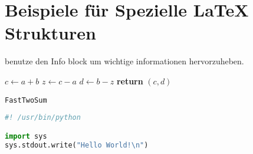 \documentclass[12pt]{article}
\begin{document}
\section{Beispiele für Spezielle LaTeX Strukturen}

\begin{info} %
	benutze den Info block um wichtige informationen hervorzuheben.
\end{info}


\begin{center}
	\begin{minipage}{0.5\linewidth} %
		\begin{algorithm}[H]
			\medskip
			$c \leftarrow a + b$ \;
			$z \leftarrow c - a$ \;
			$d \leftarrow b - z$ \;
			{\bf return} $(c,d)$ \;
			\caption{\texttt{FastTwoSum}} %
			\label{alg:fastTwoSum}   %
		\end{algorithm}
	\end{minipage}
\end{center}


\begin{file}[hello.py]
\begin{lstlisting}[language=Python]
#! /usr/bin/python

import sys
sys.stdout.write("Hello World!\n")
\end{lstlisting}
\end{file}

\end{document}
